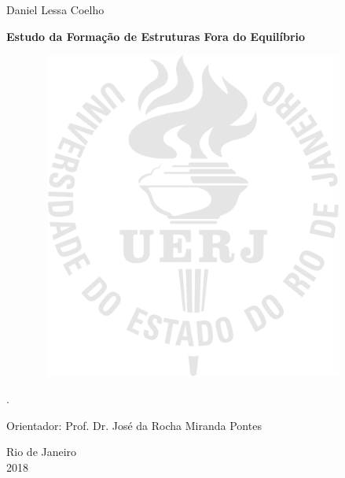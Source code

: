 \begin{center}

Daniel Lessa Coelho

\vspace{2cm}

\textbf{Estudo da Formação de Estruturas Fora do Equilíbrio}

\vspace{1.0cm}

\begin{figure}[hbt!]
\begin{center}
\includegraphics[width=10.48cm,height=10.8cm]{./01_Pre_textuais/logo_uerj_gnd_pb.png}
\end{center}
\end{figure}

\vspace{-9cm}
\begin{flushright}
\parbox{8cm}{
.
}
\end{flushright}

\vspace{4.0cm}

Orientador: Prof. Dr. José da Rocha Miranda Pontes\\

\par\vfill

Rio de Janeiro\\2018

\end{center}